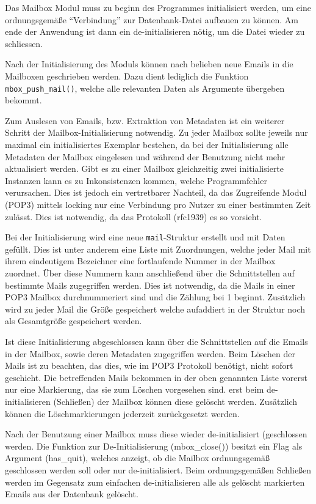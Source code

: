 \documentclass[final,a4paper,11pt,notitlepage,halfparskip]{scrreprt}
\begin{document}
Das Mailbox Modul muss zu beginn des Programmes initialisiert werden, um eine
ordnungsgemäße "`Verbindung"' zur Datenbank-Datei aufbauen zu können. Am ende der
Anwendung ist dann ein de-initialisieren nötig, um die Datei wieder zu
schliessen.

Nach der Initialisierung des Moduls können nach belieben neue Emails in die
Mailboxen geschrieben werden. Dazu dient lediglich die Funktion
\texttt{mbox\_push\_mail()}, welche alle relevanten Daten als Argumente
übergeben bekommt.

Zum Auslesen von Emails, bzw. Extraktion von Metadaten ist ein weiterer Schritt
der Mailbox-Initialisierung notwendig. Zu jeder Mailbox sollte jeweils nur
maximal ein initialisiertes Exemplar bestehen, da bei der Initialisierung alle
Metadaten der Mailbox eingelesen und während der Benutzung nicht mehr
aktualisiert werden. Gibt es zu einer Mailbox gleichzeitig zwei initialisierte
Instanzen kann es zu Inkonsistenzen kommen, welche Programmfehler verursachen.
Dies ist jedoch ein vertretbarer Nachteil, da das Zugreifende Modul (POP3)
mittels locking nur eine Verbindung pro Nutzer zu einer bestimmten Zeit zulässt.
Dies ist notwendig, da das Protokoll (rfc1939) es so vorsieht.

Bei der Initialisierung wird eine neue \texttt{mail}-Struktur erstellt und mit
Daten gefüllt. Dies ist unter anderem eine Liste mit Zuordnungen, welche jeder
Mail mit ihrem eindeutigem Bezeichner eine fortlaufende Nummer in der Mailbox
zuordnet. Über diese Nummern kann anschließend über die Schnittstellen auf
bestimmte Mails zugegriffen werden. Dies ist notwendig, da die Mails in einer
POP3 Mailbox durchnummeriert sind und die Zählung bei 1 beginnt. Zusätzlich wird
zu jeder Mail die Größe gespeichert welche aufaddiert in der Struktur noch als
Gesamtgröße gespeichert werden.

Ist diese Initialisierung abgeschlossen kann über die Schnittstellen auf die
Emails in der Mailbox, sowie deren Metadaten zugegriffen werden. Beim Löschen der
Mails ist zu beachten, das dies, wie im POP3 Protokoll benötigt, nicht sofort
geschieht. Die betreffenden Mails bekommen in der oben genannten Liste vorerst
nur eine Markierung, das sie zum Löschen vorgesehen sind. erst beim
de-initialisieren (Schließen) der Mailbox können diese gelöscht werden.
Zusätzlich können die Löschmarkierungen jederzeit zurückgesetzt werden.

Nach der Benutzung einer Mailbox muss diese wieder de-initialisiert (geschlossen
werden. Die Funktion zur De-Initialisierung (mbox\_close()) besitzt ein Flag als
Argument (has\_quit), welches anzeigt, ob die Mailbox ordnungsgemäß geschlossen
werden soll oder nur de-initialisiert. Beim ordnungsgemäßen Schließen werden im
Gegensatz zum einfachen de-initialisieren alle als gelöscht markierten Emails 
aus der Datenbank gelöscht.
\end{document}
